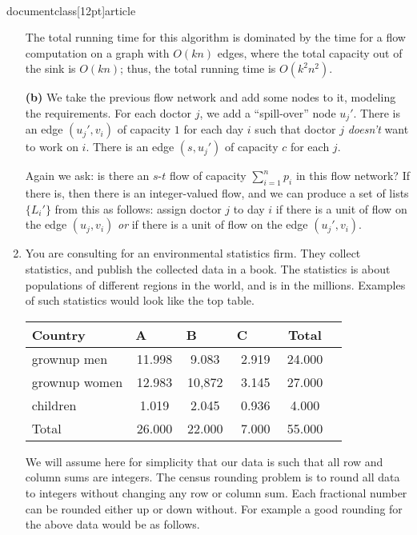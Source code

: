 \\documentclass[12pt]{article}
\begin{document}
\begin{enumerate}
{The total running time for this algorithm is dominated
by the time for a flow computation on a graph with $O(kn)$ edges,
where the total capacity out of the sink is $O(kn)$;
thus, the total running time is $O(k^2 n^2)$.

{\bf (b)} We take the previous flow network and
add some nodes to it, modeling the requirements.
For each doctor $j$, we add a ``spill-over'' node $u_j'$.
There is an edge $(u_j', v_i)$ of capacity $1$
for each day $i$ such that doctor $j$ {\em doesn't}
want to work on $i$.
There is an edge $(s,u_j')$ of capacity $c$ for each $j$.

Again we ask: is there an $s$-$t$ flow of capacity $\sum_{i=1}^n p_i$
in this flow network? 
If there is, then there is an integer-valued flow,
and we can produce a set of lists $\{L_i'\}$ from this
as follows: assign doctor $j$ to day $i$ if there
is a unit of flow on the edge $(u_j,v_i)$ 
{\em or} if there is a unit of flow on the edge $(u_j',v_i)$.

}


\item 

You are consulting for an environmental statistics firm. They
collect statistics, and publish the collected data in a book. The statistics
is about populations of different regions in the world, and is in the millions.
Examples of such statistics would look like the top table.

\begin{table}[h]
\begin{center}
\begin{tabular}{|l||c|c|c|c||c|}
\hline Country & A ~~~ & B ~~~  & C ~~~ & Total \\  \hline
grownup men  &  11.998 & 9.083 & 2.919& 24.000\\
grownup women &  12.983 & 10,872 & 3.145 & 27.000  \\  \hline
children &  1.019 &   2.045& 0.936& 4.000  \\ \hline \hline
Total &  26.000 & 22.000 & 7.000 & 55.000  \\ \hline
\end{tabular}
\end{center}
\end{table}

We will assume here for simplicity that our data is such that all
row and column sums are integers. The census rounding problem is to
round all data to integers without changing any row or column sum.
Each fractional number can be rounded either up or down without.
For example a good rounding for the above data would be as follows.


\end{enumerate}
\end{document}
